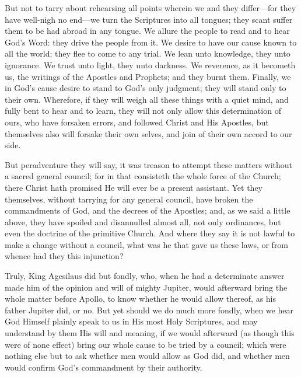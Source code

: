 But
not to tarry about rehearsing all points wherein we and they differ—for
they have well-nigh no end—we turn the Scriptures into all tongues;
they scant suffer them to be had abroad in any tongue. We allure
the people to read and to hear God’s Word: they drive the people
from it. We desire to have our cause known to all the world; they
flee to come to any trial. We lean unto knowledge, they unto ignorance.
We trust unto light, they unto darkness. We reverence, as it becometh
us, the writings of the Apostles and Prophets; and they burnt them.
Finally, we in God’s cause desire to stand to God’s only
judgment; they will stand only to their own. Wherefore, if they
will weigh all these things with a quiet mind, and fully bent to hear
and to learn, they will not only allow this determination of ours, who
have forsaken errors, and followed Christ and His Apostles, but themselves
also will forsake their own selves, and join of their own accord to
our side.


But peradventure they will say, it was treason to attempt these matters
without a sacred general council; for in that consisteth the whole force
of the Church; there Christ hath promised He will ever be a present
assistant. Yet they themselves, without tarrying for any general
council, have broken the commandments of God, and the decrees of the
Apostles; and, as we said a little above, they have spoiled and disannulled
almost all, not only ordinances, but even the doctrine of the primitive
Church. And where they say it is not lawful to make a change without
a council, what was he that gave us these laws, or from whence had they
this injunction?

Truly, King Agesilaus did but fondly, who, when he had a determinate
answer made him of the opinion and will of mighty Jupiter, would afterward
bring the whole matter before Apollo, to know whether he would allow
thereof, as his father Jupiter did, or no. But yet should we do
much more fondly, when we hear God Himself plainly speak to us in His
most Holy Scriptures, and may understand by them His will and meaning,
if we
would afterward (as though this were of none effect) bring our whole
cause to be tried by a council; which were nothing else but to ask whether
men would allow as God did, and whether men would confirm God’s
commandment by their authority.

